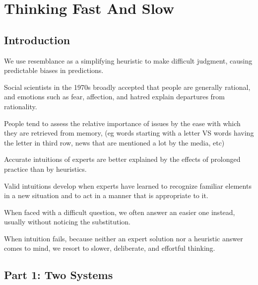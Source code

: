 \chapter{Thinking Fast And Slow} \label{ch:thinking_fast_and_slow}

\section*{Introduction}

\bit
\item We use resemblance as a simplifying heuristic to make difficult judgment, causing predictable biases in
predictions.
\item Social scientists in the 1970s broadly accepted that people are generally rational, and emotions such as fear,
affection, and hatred explain departures from rationality.
\item People tend to assess the relative importance of issues by the ease with which they are retrieved from memory,
(eg words starting with a letter VS words having the letter in third row, news that are mentioned a lot by the media,
etc)
\item Accurate intuitions of experts are better explained by the effects of prolonged practice than by heuristics.
\item Valid intuitions develop when experts have learned to recognize familiar elements in a new situation and to act
in a manner that is appropriate to it.
\item When faced with a difficult question, we often answer an easier one instead, usually without noticing the
substitution.
\item When intuition fails, because neither an expert solution nor a heuristic answer comes to mind, we resort to
slower, deliberate, and effortful thinking.
\eit

\section*{Part 1: Two Systems}

